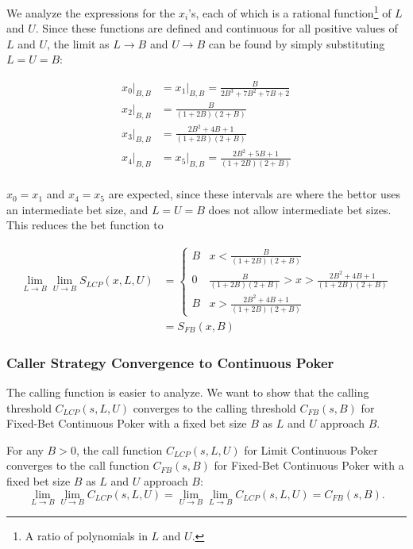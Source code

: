 \documentclass[../../main/main.tex]{subfiles}
\begin{document}
\begin{customproof}
We analyze the expressions for the $x_i$'s, each of which is a rational function\footnote{A ratio of polynomials in $L$ and $U$.} of $L$ and $U$. Since these functions are defined and continuous for all positive values of $L$ and $U$, the limit as $L \to B$ and $U \to B$ can be found by simply substituting $L = U = B$:

\begin{align*}
    x_0|_{B,B} & = x_1|_{B,B} = \frac{B}{2 B^3+7 B^2+7 B+2} \\
    x_2|_{B,B} & = \frac{B}{(1+2B)(2+B)} \\
    x_3|_{B,B} & = \frac{2 B^2+4 B+1}{(1+2B)(2+B)} \\
    x_4|_{B,B} & = x_5|_{B,B} = \frac{2 B^2+5 B+1}{(1+2B)(2+B)} \\
\end{align*}

$x_0 = x_1$ and $x_4 = x_5$ are expected, since these intervals are where the bettor uses an intermediate bet size, and $L=U=B$ does not allow intermediate bet sizes. This reduces the bet function to 

\begin{align*}
    \lim_{L \to B} \lim_{U \to B} S_{LCP}(x, L, U) & = \begin{cases}
    B & x < \frac{B}{(1+2B)(2+B)}\\
    0 & \frac{B}{(1+2B)(2+B)} > x > \frac{2 B^2+4 B+1}{(1+2B)(2+B)}\\
    B & x > \frac{2 B^2+4 B+1}{(1+2B)(2+B)}
    \end{cases}\\
    &= S_{FB}(x, B)
\end{align*}
\end{customproof}

\subsubsection{Caller Strategy Convergence to Continuous Poker}

The calling function is easier to analyze. We want to show that the calling threshold $C_{LCP}(s, L, U)$ converges to the calling threshold $C_{FB}(s, B)$ for Fixed-Bet Continuous Poker with a fixed bet size $B$ as $L$ and $U$ approach $B$.

\begin{theorem}
     For any $B > 0$, the call function $C_{LCP}(s, L, U)$ for Limit Continuous Poker converges to the call function $C_{FB}(s, B)$ for Fixed-Bet Continuous Poker with a fixed bet size $B$ as $L$ and $U$ approach $B$:
\[
\lim_{L \to B} \lim_{U \to B} C_{LCP}(s, L, U) = \lim_{U \to B} \lim_{L \to B} C_{LCP}(s, L, U) = C_{FB}(s, B).
\]
\end{theorem}
\end{document}
